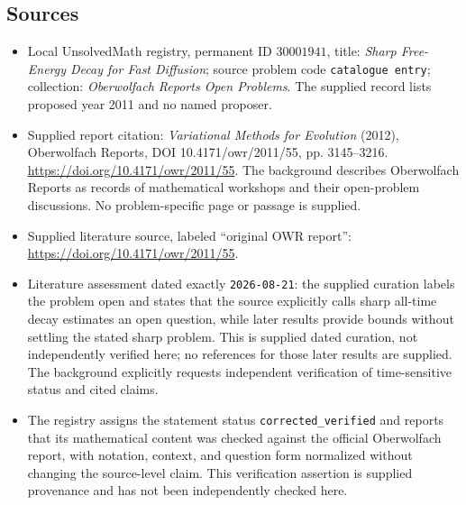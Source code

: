 \documentclass[11pt]{article}
\begin{document}
\subsection{Sources}
\begin{itemize}
\item Local UnsolvedMath registry, permanent ID \(30001941\), title: \emph{Sharp Free-Energy Decay for Fast Diffusion}; source problem code \texttt{catalogue entry}; collection: \emph{Oberwolfach Reports Open Problems}. The supplied record lists proposed year 2011 and no named proposer.
\item Supplied report citation: \emph{Variational Methods for Evolution} (2012), Oberwolfach Reports, DOI 10.4171/owr/2011/55, pp. 3145--3216. \url{https://doi.org/10.4171/owr/2011/55}. The background describes Oberwolfach Reports as records of mathematical workshops and their open-problem discussions. No problem-specific page or passage is supplied.
\item Supplied literature source, labeled ``original OWR report'': \url{https://doi.org/10.4171/owr/2011/55}.
\item Literature assessment dated exactly \texttt{2026-08-21}: the supplied curation labels the problem open and states that the source explicitly calls sharp all-time decay estimates an open question, while later results provide bounds without settling the stated sharp problem. This is supplied dated curation, not independently verified here; no references for those later results are supplied. The background explicitly requests independent verification of time-sensitive status and cited claims.
\item The registry assigns the statement status \texttt{corrected\_verified} and reports that its mathematical content was checked against the official Oberwolfach report, with notation, context, and question form normalized without changing the source-level claim. This verification assertion is supplied provenance and has not been independently checked here.
\end{itemize}
\end{document}
